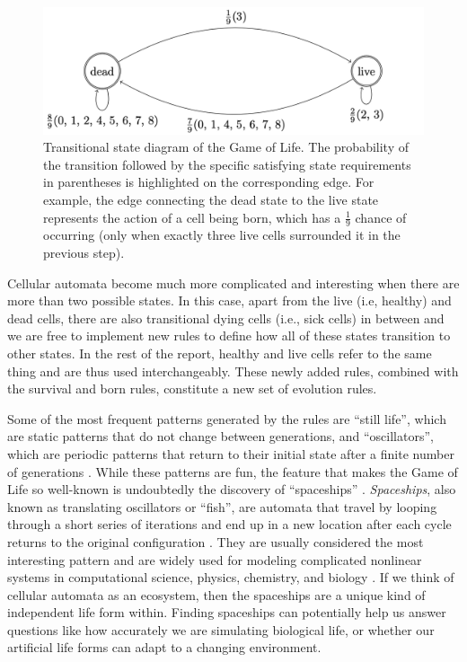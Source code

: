 \documentclass[12pt]{article}
\numberwithin{figure}{section} %
\begin{document}
\begin{figure}[H]
	\centering
	\includegraphics[width=\linewidth]{Section1/3}
	\caption[Transitional state diagram of the Game of Life]{Transitional state diagram of the Game of Life. The probability of the transition followed by the specific satisfying state requirements in parentheses is highlighted on the corresponding edge. For example, the edge connecting the dead state to the live state represents the action of a cell being born, which has a $\frac{1}{9}$ chance of occurring (only when exactly three live cells surrounded it in the previous step).}
	\label{fig:Transitional state diagram of the Game of Life}
	\vspace{-1.5em}
\end{figure}

Cellular automata become much more complicated and interesting when there are more than two possible states. In this case, apart from the live (i.e, healthy) and dead cells, there are also transitional dying cells (i.e., sick cells) in between and we are free to implement new rules to define how all of these states transition to other states. In the rest of the report, healthy and live cells refer to the same thing and are thus used interchangeably. These newly added rules, combined with the survival and born rules, constitute a new set of evolution rules. 

Some of the most frequent patterns generated by the rules are “still life”, which are static patterns that do not change between generations, and “oscillators”, which are periodic patterns that return to their initial state after a finite number of generations \cite{Cellular automaton}. While these patterns are fun, the feature that makes the Game of Life so well-known is undoubtedly the discovery of “spaceships” \cite{Glider}. \textit{Spaceships}, also known as translating oscillators or “fish”, are automata that travel by looping through a short series of iterations and end up in a new location after each cycle returns to the original configuration \cite{rake}. They are usually considered the most interesting pattern and are widely used for modeling complicated nonlinear systems in computational science, physics, chemistry, and biology \cite{Cellular automaton}. If we think of cellular automata as an ecosystem, then the spaceships are a unique kind of independent life form within. Finding spaceships can potentially help us answer questions like how accurately we are simulating biological life, or whether our artificial life forms can adapt to a changing environment. 
\end{document}
